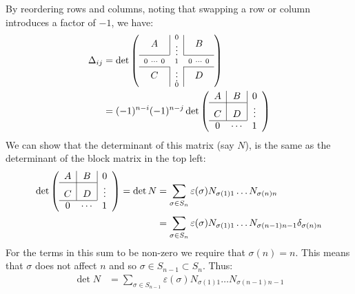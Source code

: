 \documentclass[../main.tex]{subfiles}
\begin{document}
\begin{remark}
  By reordering rows and columns, noting that swapping a row or column introduces a factor of $-1$, we have:
  \begin{align*}
    \Delta_{i j} &=
    \det \left(\begin{array}{c c c}
    A & \multicolumn{1}{|c}{\scriptstyle{\substack{0 \\ \vdots}}} & \multicolumn{1}{|c}{B} \\ \cline{1-1} \cline{3-3}
    \scriptstyle{0\ \cdots\ 0} & \scriptstyle{1} & \scriptstyle{0\ \cdots\ 0} \\ \cline{1-1} \cline{3-3}
    C & \multicolumn{1}{|c}{\scriptstyle{\substack{\vdots \\ 0}}} & \multicolumn{1}{|c}{D}
    \end{array}\right)\\
    &=(-1)^{n - i}(-1)^{n - j} \det \left(\begin{array}{c c c}
    A & \multicolumn{1}{|c}{B} & \multicolumn{1}{|c}{0} \\ \cline{1-2}
    C & \multicolumn{1}{|c}{D} & \multicolumn{1}{|c}{\vdots} \\ \cline{1-2}
    0 & \cdots & 1
    \end{array}\right)
  \end{align*}
  We can show that the determinant of this matrix (say $N$), is the same as the determinant of the block matrix in the top left:
  \begin{align*}
    \det \left(\begin{array}{c c c}
    A & \multicolumn{1}{|c}{B} & \multicolumn{1}{|c}{0} \\ \cline{1-2}
    C & \multicolumn{1}{|c}{D} & \multicolumn{1}{|c}{\vdots} \\ \cline{1-2}
    0 & \cdots & 1
    \end{array}\right) = \det N
    &= \sum_{\sigma \in S_n} \varepsilon(\sigma) N_{\sigma(1) 1} \ldots N_{\sigma(n) n} \\
    &= \sum_{\sigma \in S_n} \varepsilon(\sigma) N_{\sigma(1) 1} \ldots N_{\sigma(n - 1) n - 1} \delta_{\sigma(n) n}
  \end{align*}
  For the terms in this sum to be non-zero we require that $\sigma(n) = n$.
  This means that $\sigma$ does not affect $n$ and so $\sigma \in S_{n - 1} \subset S_n$.
  Thus:
  \begin{align*}
    \det N &= \sum_{\sigma \in S_{n - 1}} \varepsilon(\sigma) N_{\sigma(1) 1} \ldots N_{\sigma(n - 1) n - 1} \\

\end{align*}
\end{remark}
\end{document}
